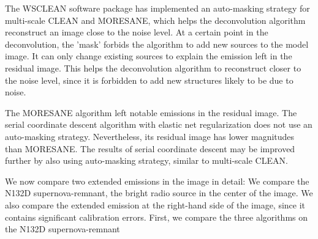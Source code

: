 The WSCLEAN software package has implemented an auto-masking strategy for multi-scale CLEAN and MORESANE, which helps the deconvolution algorithm reconstruct an image close to the noise level. At a certain point in the deconvolution, the 'mask' forbids the algorithm to add new sources to the model image. It can only change existing sources to explain the emission left in the residual image. This helps the deconvolution algorithm to reconstruct closer to the noise level, since it is forbidden to add new structures likely to be due to noise. 

The MORESANE algorithm left notable emissions in the residual image. The serial coordinate descent algorithm with elastic net regularization does not use an auto-masking strategy. Nevertheless, its residual image has lower magnitudes than MORESANE. The results of serial coordinate descent may be improved further by also using auto-masking strategy, similar to multi-scale CLEAN.

We now compare two extended emissions in the image in detail: We compare the N132D supernova-remnant, the bright radio source in the center of the image. We also compare the extended emission at the right-hand side of the image, since it contains significant calibration errors. First, we compare the three algorithms on the N132D supernova-remnant

